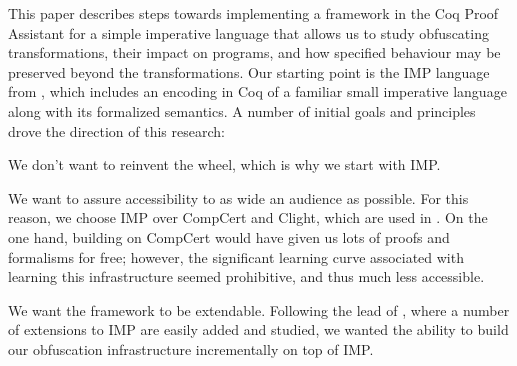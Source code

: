 \documentclass[compsoc,conference,a4paper,10pt,times]{IEEEtran}
\begin{document}
This paper describes steps towards implementing a framework in the Coq Proof Assistant \cite{Coq} for a simple imperative language that allows us to study obfuscating transformations, their impact on programs, and how specified behaviour may be preserved beyond the transformations. Our starting point is the IMP language from \cite{SFV2}, which includes an encoding in Coq of a familiar small imperative language along with its formalized semantics.
A number of initial goals and principles drove the direction of this research: 
 \begin{enumerate*}
  \item We don't want to reinvent the wheel, which is why we start with IMP.
  \item We want to assure accessibility to as wide an audience as possible. For this reason, we choose IMP over CompCert and Clight, which are used in \cite{Blazy2}.  On the one hand, building on CompCert would have given us lots of proofs and formalisms for free; however, the significant learning curve associated with learning this infrastructure seemed prohibitive, and thus much less accessible.\label{goal2}
  \item We want the framework to be extendable.  Following the lead of \cite{SFV2}, where a number of extensions to IMP are easily added and studied, we wanted the ability to build our obfuscation infrastructure incrementally on top of IMP.\label{goal3}
  \end{enumerate*}
\end{document}
